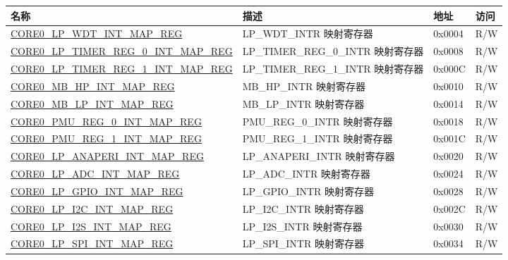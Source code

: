 \begin{longtable}{ | p{8.7cm} | p{6.2cm} | p{1.3cm} | p{1cm} | }
\hline\rowcolor{lightgray}
名称 & 描述 &  地址 & 访问 \\ \hline
\endhead
\hyperref[regdesc:CORE0LPWDTINTMAPREG]{CORE0\_LP\_WDT\_INT\_MAP\_REG} & LP\_WDT\_INTR 映射寄存器 & 0x0004 & R/W \\ \hline
\hyperref[regdesc:CORE0LPTIMERREG0INTMAPREG]{CORE0\_LP\_TIMER\_REG\_0\_INT\_MAP\_REG} & LP\_TIMER\_REG\_0\_INTR 映射寄存器 & 0x0008 & R/W \\ \hline
\hyperref[regdesc:CORE0LPTIMERREG1INTMAPREG]{CORE0\_LP\_TIMER\_REG\_1\_INT\_MAP\_REG} & LP\_TIMER\_REG\_1\_INTR 映射寄存器 & 0x000C & R/W \\ \hline
\hyperref[regdesc:CORE0MBHPINTMAPREG]{CORE0\_MB\_HP\_INT\_MAP\_REG} & MB\_HP\_INTR 映射寄存器 & 0x0010 & R/W \\ \hline
\hyperref[regdesc:CORE0MBLPINTMAPREG]{CORE0\_MB\_LP\_INT\_MAP\_REG} & MB\_LP\_INTR 映射寄存器 & 0x0014 & R/W \\ \hline
\hyperref[regdesc:CORE0PMUREG0INTMAPREG]{CORE0\_PMU\_REG\_0\_INT\_MAP\_REG} & PMU\_REG\_0\_INTR 映射寄存器 & 0x0018 & R/W \\ \hline
\hyperref[regdesc:CORE0PMUREG1INTMAPREG]{CORE0\_PMU\_REG\_1\_INT\_MAP\_REG} & PMU\_REG\_1\_INTR 映射寄存器 & 0x001C & R/W \\ \hline

\hyperref[regdesc:CORE0LPANAPERIINTMAPREG]{CORE0\_LP\_ANAPERI\_INT\_MAP\_REG} & LP\_ANAPERI\_INTR 映射寄存器 & 0x0020 & R/W \\ \hline

\hyperref[regdesc:CORE0LPADCINTMAPREG]{CORE0\_LP\_ADC\_INT\_MAP\_REG} & LP\_ADC\_INTR 映射寄存器 & 0x0024 & R/W \\ \hline

\hyperref[regdesc:CORE0LPGPIOINTMAPREG]{CORE0\_LP\_GPIO\_INT\_MAP\_REG} & LP\_GPIO\_INTR 映射寄存器 & 0x0028 & R/W \\ \hline

\hyperref[regdesc:CORE0LPI2CINTMAPREG]{CORE0\_LP\_I2C\_INT\_MAP\_REG} & LP\_I2C\_INTR 映射寄存器 & 0x002C & R/W \\ \hline

\hyperref[regdesc:CORE0LPI2SINTMAPREG]{CORE0\_LP\_I2S\_INT\_MAP\_REG} & LP\_I2S\_INTR 映射寄存器 & 0x0030 & R/W \\ \hline

\hyperref[regdesc:CORE0LPSPIINTMAPREG]{CORE0\_LP\_SPI\_INT\_MAP\_REG} & LP\_SPI\_INTR 映射寄存器 & 0x0034 & R/W \\ \hline


\end{longtable}
